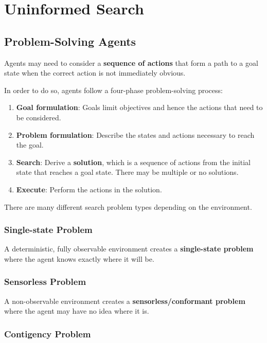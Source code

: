 \section{Uninformed Search}


\subsection{Problem-Solving Agents}

Agents may need to consider a \textbf{sequence of actions} that form a path to a goal state when the correct action is not immediately obvious.

In order to do so, agents follow a four-phase problem-solving process:

\begin{enumerate}[leftmargin=*]
    \item \textbf{Goal formulation}: Goals limit objectives and hence the actions that need to be considered.
    \item \textbf{Problem formulation}: Describe the states and actions necessary to reach the goal.
    \item \textbf{Search}: Derive a \textbf{solution}, which is a sequence of actions from the initial state that reaches a goal state. There may be multiple or no solutions.
    \item \textbf{Execute}: Perform the actions in the solution.
\end{enumerate}

There are many different search problem types depending on the environment.


\subsubsection{Single-state Problem}

A deterministic, fully observable environment creates a \textbf{single-state problem} where the agent knows exactly where it will be.


\subsubsection{Sensorless Problem}

A non-observable environment creates a \textbf{sensorless/conformant problem} where the agent may have no idea where it is.


\subsubsection{Contigency Problem}

